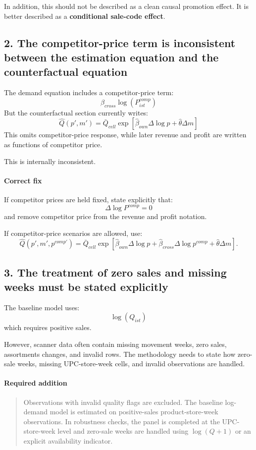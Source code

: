 \documentclass[11pt]{article}
\begin{document}
In addition, this should not be described as a clean causal promotion effect. It is better described as a \textbf{conditional sale-code effect}.

\subsection*{2. The competitor-price term is inconsistent between the estimation equation and the counterfactual equation}
The demand equation includes a competitor-price term:
\[
\beta_{cross} \log(P^{comp}_{ist})
\]
But the counterfactual section currently writes:
\[
\widehat Q(p',m') = \bar Q_{cell} \exp\left[\hat\beta_{own}\Delta \log p + \hat\theta \Delta m\right]
\]
This omits competitor-price response, while later revenue and profit are written as functions of competitor price.

This is internally inconsistent.

\paragraph{Correct fix}
If competitor prices are held fixed, state explicitly that:
\[
\Delta \log P^{comp} = 0
\]
and remove competitor price from the revenue and profit notation.

If competitor-price scenarios are allowed, use:
\[
\widehat Q(p',m',p^{comp\prime})
=
\bar Q_{cell}
\exp\left[
\hat\beta_{own}\Delta \log p
+
\hat\beta_{cross}\Delta \log p^{comp}
+
\hat\theta \Delta m
\right].
\]

\subsection*{3. The treatment of zero sales and missing weeks must be stated explicitly}
The baseline model uses:
\[
\log(Q_{ist})
\]
which requires positive sales.

However, scanner data often contain missing movement weeks, zero sales, assortments changes, and invalid rows. The methodology needs to state how zero-sale weeks, missing UPC-store-week cells, and invalid observations are handled.

\paragraph{Required addition}
\begin{quote}
Observations with invalid quality flags are excluded. The baseline log-demand model is estimated on positive-sales product-store-week observations. In robustness checks, the panel is completed at the UPC-store-week level and zero-sale weeks are handled using $\log(Q+1)$ or an explicit availability indicator.
\end{quote}
\end{document}
